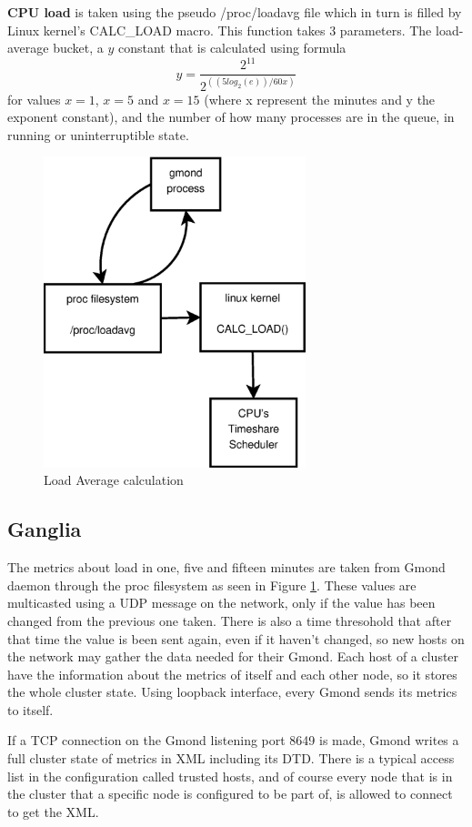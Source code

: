 {\bf CPU load} is taken using the pseudo /proc/loadavg file which in turn is
filled by Linux kernel's CALC\_LOAD macro. This function takes 3 parameters.
The load-average bucket, a $y$ constant that is calculated using formula
\[
y=\frac{2^{11}}{2^{((5log_2(e))/60x)}}
\]
for values $x=1$, $x=5$ and $x=15$ (where x represent the minutes and y the
exponent constant), and the number of how many processes are in the queue, in
running or uninterruptible state.

\begin{figure}[htb]
\centering
 \includegraphics[width=3in]{images/calc_load.eps}
\caption{Load Average calculation}
\label{figure:calc_load}
\end{figure}


\subsection{Ganglia}

The metrics about load in one, five and fifteen minutes are taken from Gmond daemon through the proc filesystem as seen in Figure \ref{figure:calc_load}. These values are multicasted using a UDP message on the network, only if the value has been changed from the previous one taken. There is also a time thresohold that after that time the value is been sent again, even if it haven't changed, so new hosts on the network may gather the data needed for their Gmond. Each host of a cluster have the information about the metrics of itself and each other node, so it stores the whole cluster state. Using loopback interface, every Gmond sends its metrics to itself.

If a TCP connection on the Gmond listening port 8649 is made, Gmond writes a full cluster state of metrics in XML including its DTD. There is a typical access list in the configuration called trusted hosts, and of course every node that is in the cluster that a specific node is configured to be part of, is allowed to connect to get the XML.

